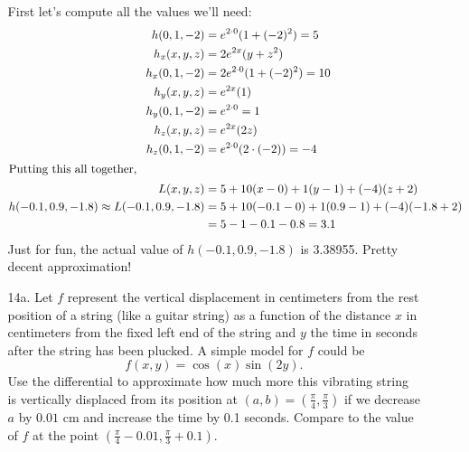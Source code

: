 \documentclass[10pt]{article}
\newenvironment{red}{\color{red}}{\ignorespacesafterend}
\begin{document}
\begin{enumerate}[leftmargin=0pt]
\begin{itemize}
        \begin{red}
        First let's compute all the values we'll need:
        \begin{align*}
            h(0, 1, -2) &= e^{2\cdot 0}(1 + (-2)^2) = 5 \\
            h_x(x,y,z) &= 2 e^{2x}(y + z^2) \\
            h_x(0, 1, -2) & =2 e^{2\cdot 0}(1 + (-2)^2) = 10 \\
            h_y(x,y,z) &= e^{2x}(1) \\
            h_y(0, 1, -2) &= e^{2\cdot 0} = 1 \\
            h_z(x,y,z) &= e^{2x}(2z) \\
            h_z(0, 1, -2) &= e^{2\cdot 0} (2\cdot(-2)) = -4 \\
            \intertext{Putting this all together,}
            L(x,y,z) &= 5 + 10(x-0) + 1(y-1) + (-4)(z + 2) \\
            h(-0.1, 0.9, -1.8) \approx 
            L(-0.1, 0.9, -1.8) &= 5 + 10(-0.1 - 0) + 1(0.9-1)+(-4)(-1.8 + 2) \\
            &= 5  -1 -0.1 -0.8 = 3.1
        \end{align*}
        Just for fun, the actual value of $h(-0.1, 0.9, -1.8)$ is 3.38955. Pretty decent approximation!
        \end{red}
        
        \item[14a.] Let $f$ represent the vertical displacement in centimeters from the rest position of a string (like a guitar string) as a function of the distance $x$ in centimeters from the fixed left end of the string and $y$ the time in seconds after the string has been plucked. A simple model for $f$ could be \[f(x, y) = \cos(x)\sin(2y).\]
        Use the differential to approximate how much more this vibrating string is vertically displaced from its position at $(a,b) = \left(\tfrac{\pi}{4}, \tfrac{\pi}{3}\right)$ if we decrease $a$ by $0.01$ cm and increase the time by 0.1 seconds. Compare to the value of $f$ at the point $\left(\tfrac{\pi}{4}-0.01, \tfrac{\pi}{3}+0.1\right)$.
        

\end{itemize}
\end{enumerate}
\end{document}
